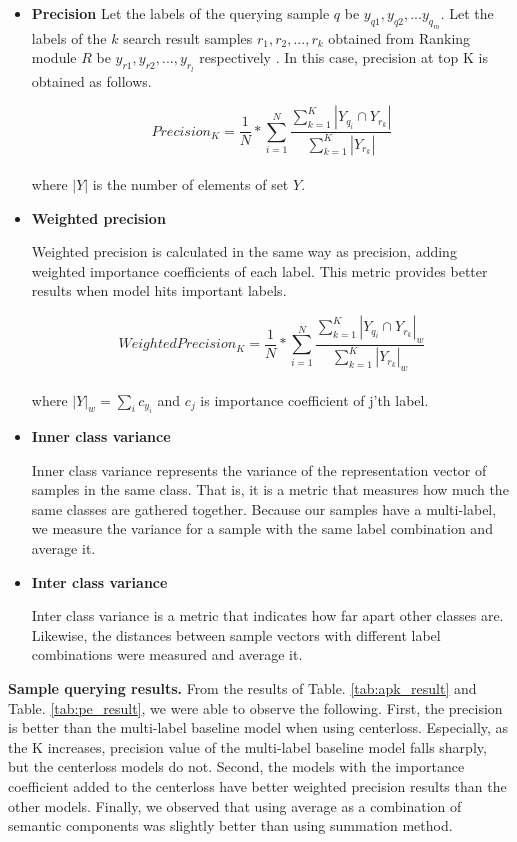 \begin{itemize}
	\item{ \textbf{Precision} 
	Let the labels of the querying sample $q$ be $y_{q1}, y_{q2}, ... y_{q_m}$. Let the labels of the $k$ search result samples $r_1, r_2, ..., r_k$ obtained from Ranking module $R$ be $y_{r1}, y_{r2}, ..., y_{r_l}$ respectively . In this case, precision at top K is obtained as follows.

	\[
	Precision_{K} = \frac{1}{N} *\sum_{i=1}^{N}{ \frac{ \sum_{k=1}^{K}{|Y_{q_i} \cap Y_{r_k}|}}{  \sum_{k=1}^{K}{ |Y_{r_k}| }  }}
	\]\\
	where $|Y|$ is the number of elements of set $Y$.
	}
	\item{ \textbf{Weighted precision} 
	
	Weighted precision is calculated in the same way as precision, adding weighted importance coefficients of each label. This metric provides better results when model hits important labels.

	\[
	WeightedPrecision_{K} = \frac{1}{N} *\sum_{i=1}^{N}{ \frac{ \sum_{k=1}^{K}{|Y_{q_i} \cap Y_{r_k}|_w}}{  \sum_{k=1}^{K}{ |Y_{r_k}|_w }  }}
	\]\\
	where $|Y|_w = \sum_i{c_{y_i}}$ and $c_j$ is importance coefficient of j'th label.
	}
	\item{ \textbf{Inner class variance} 
	
	Inner class variance represents the variance of the representation vector of samples in the same class. That is, it is a metric that measures how much the same classes are gathered together. Because our samples have a multi-label, we measure the variance for a sample with the same label combination and average it.
  
	}
	\item{ \textbf{Inter class variance} 
	
	Inter class variance is a metric that indicates how far apart other classes are. Likewise, the distances between sample vectors with different label combinations were measured and average it.
 
	}
\end{itemize}



\textbf{Sample querying results. }
From the results of Table. \ref{tab:apk_result} and Table. \ref{tab:pe_result}, we were able to observe the following. First, the precision is better than the multi-label baseline model when using centerloss. Especially, as the K increases, precision value of the multi-label baseline model falls sharply, but the centerloss models do not. Second, the models with the importance coefficient added to the centerloss have better weighted precision results than the other models. Finally, we observed that using average as a combination of semantic components was slightly better than using summation method.

